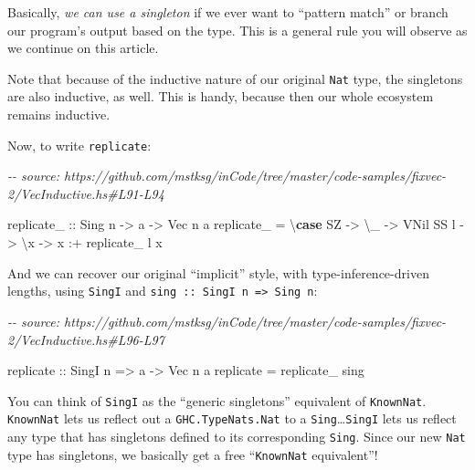 \documentclass[]{article}
\newenvironment{Shaded}{}{}
\newcommand{\CommentTok}[1]{\textcolor[rgb]{0.38,0.63,0.69}{\textit{#1}}}
\newcommand{\DataTypeTok}[1]{\textcolor[rgb]{0.56,0.13,0.00}{#1}}
\newcommand{\FunctionTok}[1]{\textcolor[rgb]{0.02,0.16,0.49}{#1}}
\newcommand{\KeywordTok}[1]{\textcolor[rgb]{0.00,0.44,0.13}{\textbf{#1}}}
\newcommand{\NormalTok}[1]{#1}
\newcommand{\OperatorTok}[1]{\textcolor[rgb]{0.40,0.40,0.40}{#1}}
\newcommand{\OtherTok}[1]{\textcolor[rgb]{0.00,0.44,0.13}{#1}}
\begin{document}
Basically, \emph{we can use a singleton} if we ever want to ``pattern match'' or
branch our program's output based on the type. This is a general rule you will
observe as we continue on this article.

Note that because of the inductive nature of our original \texttt{Nat} type, the
singletons are also inductive, as well. This is handy, because then our whole
ecosystem remains inductive.

Now, to write \texttt{replicate}:

\begin{Shaded}
\begin{Highlighting}[]
\CommentTok{{-}{-} source: https://github.com/mstksg/inCode/tree/master/code{-}samples/fixvec{-}2/VecInductive.hs\#L91{-}L94}

\OtherTok{replicate\_ ::} \DataTypeTok{Sing}\NormalTok{ n }\OtherTok{{-}>}\NormalTok{ a }\OtherTok{{-}>} \DataTypeTok{Vec}\NormalTok{ n a}
\NormalTok{replicate\_ }\OtherTok{=}\NormalTok{ \textbackslash{}}\KeywordTok{case}
    \DataTypeTok{SZ}   \OtherTok{{-}>}\NormalTok{ \textbackslash{}\_ }\OtherTok{{-}>} \DataTypeTok{VNil}
    \DataTypeTok{SS}\NormalTok{ l }\OtherTok{{-}>}\NormalTok{ \textbackslash{}x }\OtherTok{{-}>}\NormalTok{ x }\OperatorTok{:+}\NormalTok{ replicate\_ l x}
\end{Highlighting}
\end{Shaded}

And we can recover our original ``implicit'' style, with type-inference-driven
lengths, using \texttt{SingI} and
\texttt{sing\ ::\ SingI\ n\ =\textgreater{}\ Sing\ n}:

\begin{Shaded}
\begin{Highlighting}[]
\CommentTok{{-}{-} source: https://github.com/mstksg/inCode/tree/master/code{-}samples/fixvec{-}2/VecInductive.hs\#L96{-}L97}

\FunctionTok{replicate}\OtherTok{ ::} \DataTypeTok{SingI}\NormalTok{ n }\OtherTok{=>}\NormalTok{ a }\OtherTok{{-}>} \DataTypeTok{Vec}\NormalTok{ n a}
\FunctionTok{replicate} \OtherTok{=}\NormalTok{ replicate\_ sing}
\end{Highlighting}
\end{Shaded}

You can think of \texttt{SingI} as the ``generic singletons'' equivalent of
\texttt{KnownNat}. \texttt{KnownNat} lets us reflect out a
\texttt{GHC.TypeNats.Nat} to a \texttt{Sing}\ldots{}\texttt{SingI} lets us
reflect any type that has singletons defined to its corresponding \texttt{Sing}.
Since our new \texttt{Nat} type has singletons, we basically get a free
``\texttt{KnownNat} equivalent''!
\end{document}
